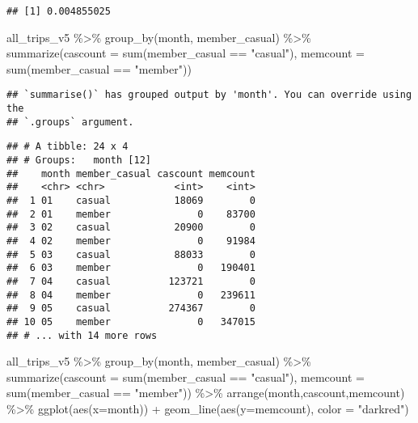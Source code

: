 \documentclass[
]{article}
\newenvironment{Shaded}{\begin{snugshade}}{\end{snugshade}}
\newcommand{\AttributeTok}[1]{\textcolor[rgb]{0.77,0.63,0.00}{#1}}
\newcommand{\FunctionTok}[1]{\textcolor[rgb]{0.00,0.00,0.00}{#1}}
\newcommand{\NormalTok}[1]{#1}
\newcommand{\SpecialCharTok}[1]{\textcolor[rgb]{0.00,0.00,0.00}{#1}}
\newcommand{\StringTok}[1]{\textcolor[rgb]{0.31,0.60,0.02}{#1}}
\begin{document}
\begin{verbatim}
## [1] 0.004855025
\end{verbatim}

\begin{Shaded}
\begin{Highlighting}[]
\NormalTok{all\_trips\_v5 }\SpecialCharTok{\%\textgreater{}\%} 
  \FunctionTok{group\_by}\NormalTok{(month, member\_casual) }\SpecialCharTok{\%\textgreater{}\%}
  \FunctionTok{summarize}\NormalTok{(}\AttributeTok{cascount =} \FunctionTok{sum}\NormalTok{(member\_casual }\SpecialCharTok{==} \StringTok{"casual"}\NormalTok{), }\AttributeTok{memcount =} \FunctionTok{sum}\NormalTok{(member\_casual }\SpecialCharTok{==} \StringTok{"member"}\NormalTok{))}
\end{Highlighting}
\end{Shaded}

\begin{verbatim}
## `summarise()` has grouped output by 'month'. You can override using the
## `.groups` argument.
\end{verbatim}

\begin{verbatim}
## # A tibble: 24 x 4
## # Groups:   month [12]
##    month member_casual cascount memcount
##    <chr> <chr>            <int>    <int>
##  1 01    casual           18069        0
##  2 01    member               0    83700
##  3 02    casual           20900        0
##  4 02    member               0    91984
##  5 03    casual           88033        0
##  6 03    member               0   190401
##  7 04    casual          123721        0
##  8 04    member               0   239611
##  9 05    casual          274367        0
## 10 05    member               0   347015
## # ... with 14 more rows
\end{verbatim}

\begin{Shaded}
\begin{Highlighting}[]
\NormalTok{all\_trips\_v5 }\SpecialCharTok{\%\textgreater{}\%} 
  \FunctionTok{group\_by}\NormalTok{(month, member\_casual) }\SpecialCharTok{\%\textgreater{}\%}
  \FunctionTok{summarize}\NormalTok{(}\AttributeTok{cascount =} \FunctionTok{sum}\NormalTok{(member\_casual }\SpecialCharTok{==} \StringTok{"casual"}\NormalTok{), }\AttributeTok{memcount =} \FunctionTok{sum}\NormalTok{(member\_casual }\SpecialCharTok{==} \StringTok{"member"}\NormalTok{)) }\SpecialCharTok{\%\textgreater{}\%}
  \FunctionTok{arrange}\NormalTok{(month,cascount,memcount)  }\SpecialCharTok{\%\textgreater{}\%} 
  \FunctionTok{ggplot}\NormalTok{(}\FunctionTok{aes}\NormalTok{(}\AttributeTok{x=}\NormalTok{month)) }\SpecialCharTok{+} \FunctionTok{geom\_line}\NormalTok{(}\FunctionTok{aes}\NormalTok{(}\AttributeTok{y=}\NormalTok{memcount), }\AttributeTok{color =} \StringTok{"darkred"}\NormalTok{)}
\end{Highlighting}
\end{Shaded}
\end{document}
